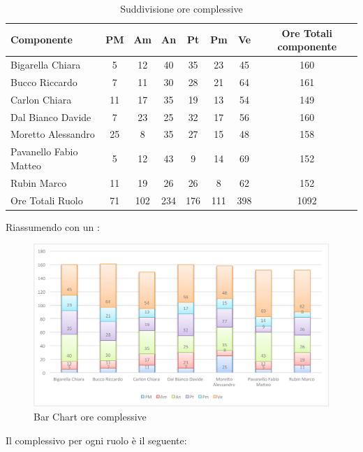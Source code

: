 				\begin{table}[H]
					\begin{center}
						\begin{tabular}{| l | c | c | c | c | c | c | c |}
							\hline									
								Componente 				&PM 	&Am 	&An 	&Pt 	&Pm 	&Ve 	&Ore Totali componente	\\ \hline	
								Bigarella Chiara 		&5		&12		&40		&35		&23		&45		&160	\\	
								Bucco Riccardo 			&7		&11		&30		&28		&21		&64		&161	\\	
								Carlon Chiara 			&11		&17		&35		&19		&13		&54		&149	\\	
								Dal Bianco Davide 		&7		&23		&25		&32		&17		&56		&160	\\	
								Moretto Alessandro 		&25		&8		&35		&27		&15		&48		&158	\\	
								Pavanello Fabio Matteo 	&5		&12		&43		&9		&14		&69		&152	\\	
								Rubin Marco 			&11		&19		&26		&26		&8		&62		&152	\\\hline\hline	

								Ore Totali Ruolo		&71		&102	&234	&176	&111	&398	&1092	\\\hline	
						\end{tabular}
					\end{center}
					\caption{Suddivisione ore complessive}
				\end{table}
				Riassumendo con un :
				\begin{figure}[H]\centering
					\includegraphics[width=\textwidth]{PianoDiProgetto/Pics/ChartOreTot.pdf}
					\caption{Bar Chart ore complessive}
				\end{figure}
				Il complessivo per ogni ruolo è il seguente:

